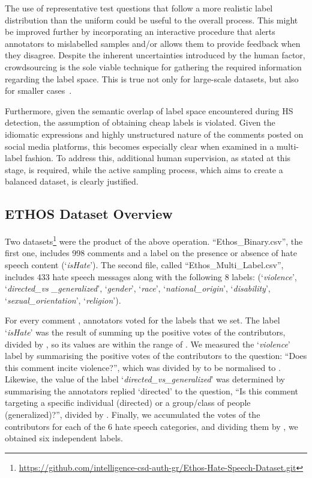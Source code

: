 \documentclass{article}
\begin{document}
The use of representative test questions that follow a more realistic label distribution than the uniform could be useful to the overall process. This might be improved further by incorporating an interactive procedure that alerts annotators to mislabelled samples and/or allows them to provide feedback when they disagree. Despite the inherent uncertainties introduced by the human factor, crowdsourcing is the sole viable technique for gathering the required information regarding the label space. This is true not only for large-scale datasets, but also for smaller cases~\cite{DBLP:conf/eacl/NghiemBA21}. 

Furthermore, given the semantic overlap of label space encountered during HS detection, the assumption of obtaining cheap labels is violated. Given the idiomatic expressions and highly unstructured nature of the comments posted on social media platforms, this becomes especially clear when examined in a multi-label fashion. To address this, additional human supervision, as stated at this stage, is required, while the active sampling process, which aims to create a balanced dataset, is clearly justified.



\subsection{ETHOS Dataset Overview}

Two datasets\footnote{\url{https://github.com/intelligence-csd-auth-gr/Ethos-Hate-Speech-Dataset.git}}
were the product of the above operation. ``Ethos\_Binary.csv'', the first one, includes 998 comments and a label on the presence or absence of hate speech content (`\textit{isHate}'). The second file, called ``Ethos\_Multi\_Label.csv'', includes 433 hate speech messages along with the following 8 labels: (`\textit{violence}', `\textit{directed\_vs \_generalized}', `\textit{gender}', `\textit{race}', `\textit{national\_origin}', `\textit{disability}', `\textit{sexual\_orientation}', `\textit{religion}'). 

For every comment ,  annotators voted for the labels that we set. The label `\textit{isHate}' was the result of summing up the positive votes  of the contributors, divided by , so its values are within the range of . We measured the `\textit{violence}' label by summarising the positive votes of the contributors  to the question: ``Does this comment incite violence?'', which was divided by  to be normalised to . Likewise, the value of the label `\textit{directed\_vs\_generalized}' was determined by summarising the annotators replied `directed'  to the question, ``Is this comment targeting a specific individual (directed) or a group/class of people (generalized)?'', divided by . Finally, we accumulated the votes of the  contributors for each of the 6 hate speech categories, and dividing them by , we obtained six independent labels.
\end{document}
